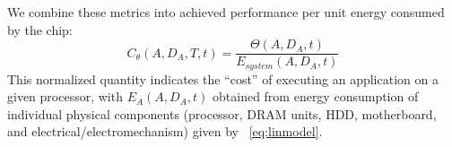 We combine these metrics into achieved performance per unit energy
consumed by the chip:
\begin{equation}
\label{eq:thermcost} C_{\theta}(A, D_{A}, T, t)=\frac{\Theta (A, D_{A}, t)}{E_{system}(A, D_{A}, t)}
\end{equation}
This normalized quantity indicates the ``cost'' of executing an
application on a given processor, with $E_{A}(A, D_{A}, t)$ obtained
from energy consumption of individual physical components (processor,
DRAM units, HDD, motherboard, and electrical/electromechanism) given by
\equationname~\eqref{eq:linmodel}.

